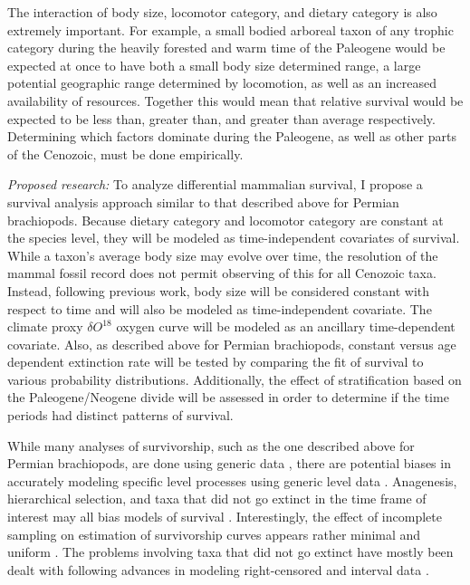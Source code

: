 \documentclass[12pt,letterpaper]{article}
\begin{document}
The interaction of body size, locomotor category, and dietary category is also extremely important. For example, a small bodied arboreal taxon of any trophic category during the heavily forested and warm time of the Paleogene would be expected at once to have both a small body size determined range, a large potential geographic range determined by locomotion, as well as an increased availability of resources. Together this would mean that relative survival would be expected to be less than, greater than, and greater than average respectively. Determining which factors dominate during the Paleogene, as well as other parts of the Cenozoic, must be done empirically.


\textit{Proposed research:}
  To analyze differential mammalian survival, I propose a survival analysis approach similar to that described above for Permian brachiopods. Because dietary category and locomotor category are constant at the species level, they will be modeled as time-independent covariates of survival. While a taxon's average body size may evolve over time, the resolution of the mammal fossil record does not permit observing of this for all Cenozoic taxa. Instead, following previous work, body size will be considered constant with respect to time and will also be modeled as time-independent covariate. The climate proxy \(\delta O^{18}\) oxygen curve \citep{Zachos2008} will be modeled as an ancillary time-dependent covariate. Also, as described above for Permian brachiopods, constant versus age dependent extinction rate will be tested by comparing the fit of survival to various probability distributions. Additionally, the effect of stratification based on the Paleogene/Neogene divide will be assessed in order to determine if the time periods had distinct patterns of survival.

While many analyses of survivorship, such as the one described above for Permian brachiopods, are done using generic data \citep{Tomiya2013,Liow2008,Harnik2013}, there are potential biases in accurately modeling specific level processes using generic level data \citep{Raup1975,Sepkoski1975,Simpson2006,Raup1991a,VanValen1979}. Anagenesis, hierarchical selection, and taxa that did not go extinct in the time frame of interest may all bias models of survival \citep{Raup1975,VanValen1979,Simpson2006,Raup1991a}. Interestingly, the effect of incomplete sampling on estimation of survivorship curves appears rather minimal and uniform \citep{Sepkoski1975}. The problems involving taxa that did not go extinct have mostly been dealt with following advances in modeling right-censored and interval data \citep{Kleinbaum2005}.
\end{document}
